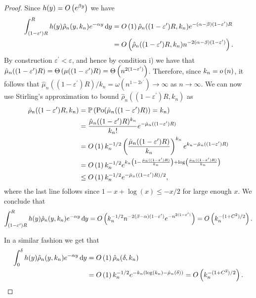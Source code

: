 \begin{proof}
Since $h(y) = O\left(e^{\beta y}\right)$ we have
\begin{align*}
	\int_{(1-\varepsilon^\prime)R}^{R} h(y) \hat{\rho}_n(y,k_n) e^{-\alpha y} \operatorname{\mathrm{d}\hspace{-2pt}} y
	&= O\left(1\right) \hat{\rho}_n((1-\varepsilon^\prime)R,k_n) e^{-(\alpha-\beta)(1-\varepsilon^\prime)R} \\
	&= O\left(\hat{\rho}_n((1-\varepsilon^\prime)R,k_n) n^{-2(\alpha-\beta)(1-\varepsilon^\prime)}\right).
\end{align*}
By construction $\varepsilon^\prime < \varepsilon$, and hence by condition i) we have that $\hat{\mu}_n((1-\varepsilon^\prime)R) = \Theta\left(\mu((1-\varepsilon^\prime)R\right) = \Theta\left(n^{2(1-\varepsilon^\prime)}\right)$. Therefore, since $k_n = o\left(n\right)$, it follows that $\hat{\mu}_n((1-\varepsilon^\prime)R)/k_n = \omega\left(n^{1 - 2\varepsilon^\prime}\right) \to \infty$ as $n \to \infty$. We can now use Stirling's approximation to bound $\hat{\rho}_n((1-\varepsilon^\prime)R,k_n)$ as
\begin{align*}
	\hat{\rho}_n((1-\varepsilon^\prime)R,k_n) &= \mathbb{P}\left({\mathrm{Po}}(\hat{\mu}_n((1-\varepsilon^\prime)R)) = k_n\right) \\
	&= \frac{\hat{\mu}_n((1-\varepsilon^\prime)R)^{k_n}}{k_n!} e^{-\hat{\mu}_n((1-\varepsilon^\prime)R)}\\
	&= O\left(1\right) k_n^{-1/2} \left(\frac{\hat{\mu}_n((1-\varepsilon^\prime)R)}{k_n}\right)^{k_n} e^{k_n - \hat{\mu}_n((1-\varepsilon^\prime)R)}\\
	&= O\left(1\right) k_n^{-1/2} e^{k_n\left(1 - \frac{\hat{\mu}_n((1-\varepsilon^\prime)R)}{k_n}\right)+ \log\left(\frac{\hat{\mu}_n((1-\varepsilon^\prime)R)}{k_n}\right)}\\
	&\le O\left(1\right) k_n^{-1/2} e^{-\hat{\mu}_n((1-\varepsilon^\prime)R)/2},
\end{align*}
where the last line follows since $1 - x + \log(x) \le -x/2$ for large enough $x$. We conclude that
\[
	\int_{(1-\varepsilon^\prime)R}^{R} h(y) \hat{\rho}_n(y,k_n) e^{-\alpha y} \operatorname{\mathrm{d}\hspace{-2pt}} y
	= O\left(k_n^{-1/2} n^{-2(\beta-\alpha)(1-\varepsilon^\prime)} e^{-n^{2(1-\varepsilon^\prime)}}\right)
	= O\left(k_n^{-(1+C^2)/2}\right).
\]

In a similar fashion we get that
\begin{align*}
	\int_0^\delta h(y) \hat{\rho}_n(y,k_n) e^{-\alpha y} \operatorname{\mathrm{d}\hspace{-2pt}} y
	&= O\left(1\right) \hat{\rho}_n(\delta, k_n) \\
	&= O\left(1\right) k_n^{-1/2} e^{-k_n(\log(k_n)-\hat{\mu}_n(\delta))} = O\left(k_n^{-(1+C^2)/2}\right).
\end{align*}




\end{proof}

